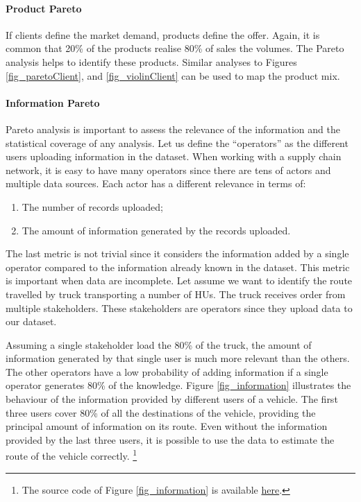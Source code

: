 \paragraph{Product Pareto}

If clients define the market demand, products define the offer. Again, it is common that 20\% of the products realise 80\% of sales the volumes. The Pareto analysis helps to identify these products. Similar analyses to Figures \ref{fig_paretoClient}, and \ref{fig_violinClient} can be used to map the product mix.

\paragraph{Information Pareto}
Pareto analysis is important to assess the relevance of the information and the statistical coverage of any analysis. Let us define the “operators” as the different users uploading information in the dataset. When working with a supply chain network, it is easy to have many operators since there are tens of actors and multiple data sources. Each actor has a different relevance in terms of:

\begin{enumerate}
    \item The number of records uploaded;
    \item The amount of information generated by the records uploaded.
\end{enumerate}

The last metric is not trivial since it considers the information added by a single operator compared to the information already known in the dataset. This metric is important when data are incomplete. Let assume we want to identify the route travelled by truck transporting a number of HUs. The truck receives order from multiple stakeholders. These stakeholders are operators since they upload data to our dataset.\par 

Assuming a single stakeholder load the 80\% of the truck, the amount of information generated by that single user is much more relevant than the others. The other operators have a low probability of adding information if a single operator generates 80\% of the knowledge. Figure \ref{fig_information} illustrates the behaviour of the information provided by different users of a vehicle. The first three users cover 80\% of all the destinations of the vehicle, providing the principal amount of information on its route. Even without the information provided by the last three users, it is possible to use the data to estimate the route of the vehicle correctly. \footnote{The source code of Figure \ref{fig_information} is available \href{https://github.com/aletuf93/logproj/blob/master/examples/DIST_01\%20Supply\%20Chain\%20Assessment.ipynb}{here}.}

